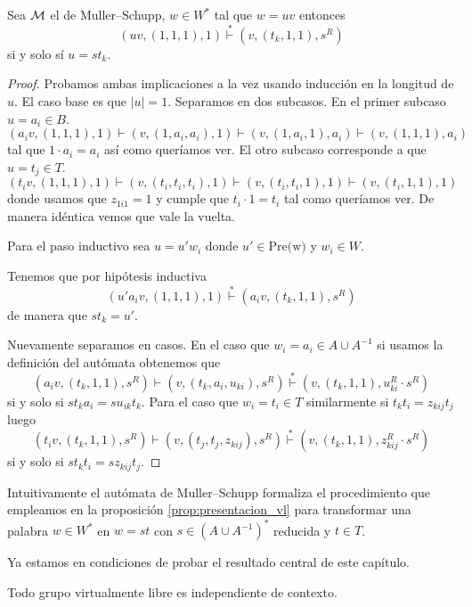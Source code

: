 \documentclass[tesis.tex]{subfiles}
\begin{document}
	\begin{lema}\label{lema_MuSc_invariante}
	Sea $\cal M$ el \APD de Muller--Schupp, $w \in W^*$ tal que $ w = uv $ entonces  
		\[
			(uv,(1,1,1), 1) \overset{*}{\vdash} (v, (t_{k},1,1), s^R)
		\]
		si y solo sí $u = st_{k}$.
	\end{lema}
	
	\begin{proof}
		Probamos ambas implicaciones a la vez usando inducción en la longitud de $u$.
		El caso base es que $|u| = 1$.
		Separamos en dos subcasos. 
		En el primer subcaso $u = a_{i} \in B$.
		\[
		(a_{i}v, ( 1,1,1), 1 ) \vdash (v, (1,a_{i},a_{i}),1) \vdash (v,(1,a_{i},1),a_{i}) \vdash (v, (1,1,1), a_{i})
		\]
		tal que $1 \cdot a_{i} = a_{i}$ así como queríamos ver.
		El otro subcaso corresponde a que $u = t_{j} \in T$.
		\[
		(t_{i}v, (1,1,1), 1) \vdash (v, (t_{i},t_{i},t_{i}),1) \vdash (v,(t_{i},t_{i},1),1) \vdash (v, (t_{i},1,1), 1)
		\]
		donde usamos que $z_{1i1} = 1$ y cumple que $t_{i} \cdot 1 = t_{i}$ tal como queríamos ver.
		De manera idéntica vemos que vale la vuelta.
		
		Para el paso inductivo sea $u = u'w_{i}$ donde $u' \in \text{Pre(w)}$ y $w_{i} \in W$.

		Tenemos que por hipótesis inductiva
		\[
		(u'a_{i}v, ( 1,1,1), 1 ) \overset{*}{\vdash} (a_{i}v, (t_{k},1,1), s^R)
		\]
		de manera que $st_{k} = u'$.
		
		Nuevamente separamos en casos.
		En el caso que $w_{i} = a_{i} \in A \cup A^{-1}$	
		si usamos la definición del autómata obtenemos que  
		\[
			(a_{i}v, (t_{k},1,1), s^R) {\vdash} 
			(v, (t_{k},a_{i},u_{ki}), s^R ) \overset{*}{\vdash }
			(v, (t_{k}, 1,1), u_{ki}^R \cdot s^R)
		\]
		si y solo si $st_{k}a_{i} = su_{ik}t_{k}$.
		Para el caso que $w_{i} = t_{i} \in T$ similarmente si $t_{k}t_{i} = z_{kij} t_{j}$ luego
		\[
		(t_{i}v, (t_{k},1,1), s^R) {\vdash} 
		(v, (t_{j},t_{j},z_{kij}), s^R ) \overset{*}{\vdash }
		(v, (t_{k}, 1,1), z_{kij}^R \cdot s^R)
		\]
		si y solo si $st_{k}t_{i} = sz_{kij}t_{j}$.
	\end{proof}
	
	
	Intuitivamente el autómata de Muller--Schupp formaliza el procedimiento que empleamos en la proposición \ref{prop:presentacion_vl} para transformar una palabra $w \in W^*$ en $w = st$ con $s \in (A \cup A^{-1})^{*}$ reducida y $t \in T$.
	
	Ya estamos en condiciones de probar el resultado central de este capítulo.

\begin{teo}\label{teo_Muller_Schupp}\cite{muller1983groups}
	Todo grupo virtualmente libre es independiente de contexto.
\end{teo}
\end{document}
